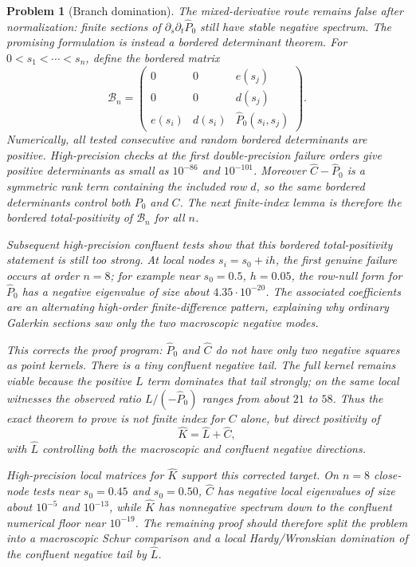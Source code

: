\documentclass[11pt]{article}
\newtheorem{problem}[theorem]{Problem}
\begin{document}
\begin{problem}[Branch domination]
The mixed-derivative route remains false after normalization: finite sections
of $\partial_s\partial_t\widehat P_0$ still have stable negative spectrum.
The promising formulation is instead a bordered determinant theorem.  For
$0<s_1<\cdots<s_n$, define the bordered matrix
\[
  \mathcal B_n=
  \begin{pmatrix}
  0&0&e(s_j)\\
  0&0&d(s_j)\\
  e(s_i)&d(s_i)&\widehat P_0(s_i,s_j)
  \end{pmatrix}.
\]
Numerically, all tested consecutive and random bordered determinants are
positive.  High-precision checks at the first double-precision failure orders
give positive determinants as small as $10^{-86}$ and $10^{-101}$.  Moreover
$\widehat C-\widehat P_0$ is a symmetric rank term containing the included row
$d$, so the same bordered determinants control both $P_0$ and $C$.
The next finite-index lemma is therefore the bordered total-positivity of
$\mathcal B_n$ for all $n$.

Subsequent high-precision confluent tests show that this bordered
total-positivity statement is still too strong.  At local nodes
$s_i=s_0+ih$, the first genuine failure occurs at order $n=8$; for example
near $s_0=0.5$, $h=0.05$, the row-null form for $\widehat P_0$ has a negative
eigenvalue of size about $4.35\cdot10^{-20}$.  The associated coefficients are
an alternating high-order finite-difference pattern, explaining why ordinary
Galerkin sections saw only the two macroscopic negative modes.

This corrects the proof program: $\widehat P_0$ and $\widehat C$ do not have
only two negative squares as point kernels.  There is a tiny confluent negative
tail.  The full kernel remains viable because the positive $L$ term dominates
that tail strongly; on the same local witnesses the observed ratio
$L/(-\widehat P_0)$ ranges from about $21$ to $58$.  Thus the exact theorem to
prove is not finite index for $C$ alone, but direct positivity of
\[
  \widehat K=\widehat L+\widehat C,
\]
with $\widehat L$ controlling both the macroscopic and confluent negative
directions.

High-precision local matrices for $\widehat K$ support this corrected target.
On $n=8$ close-node tests near $s_0=0.45$ and $s_0=0.50$, $\widehat C$ has
negative local eigenvalues of size about $10^{-5}$ and $10^{-13}$, while
$\widehat K$ has nonnegative spectrum down to the confluent numerical floor
near $10^{-19}$.  The remaining proof should therefore split the problem into
a macroscopic Schur comparison and a local Hardy/Wronskian domination of the
confluent negative tail by $\widehat L$.


\end{problem}
\end{document}
